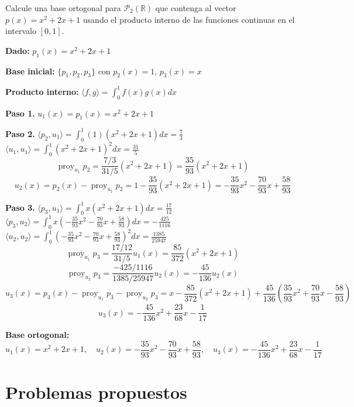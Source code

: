 \begin{prob} 
Calcule una base ortogonal para $\mathcal{P}_{2}(\mathbb{R})$ que contenga al vector $p(x)=x^2+2x+1$ usando el producto interno de las funciones continuas en el intervalo $[0,1].$
\begin{myproof}
\textbf{Dado:} $p_1(x) = x^2 + 2x + 1$

\textbf{Base inicial:} $\{p_1, p_2, p_3\}$ con $p_2(x) = 1$, $p_3(x) = x$

\textbf{Producto interno:} $\langle f, g \rangle = \int_0^1 f(x)g(x)  dx$

\textbf{Paso 1.}  
$u_1(x) = p_1(x) = x^2 + 2x + 1$

\textbf{Paso 2.}  
$\langle p_2, u_1 \rangle = \int_0^1 (1)(x^2 + 2x + 1)  dx = \frac{7}{3}$ \\
$\langle u_1, u_1 \rangle = \int_0^1 (x^2 + 2x + 1)^2  dx = \frac{31}{5}$ \\
\[
\operatorname{proy}_{u_1} p_2 = \frac{7/3}{31/5} (x^2 + 2x + 1) = \frac{35}{93} (x^2 + 2x + 1)
\]
\[
u_2(x) = p_2(x) - \operatorname{proy}_{u_1} p_2 = 1 - \frac{35}{93}(x^2 + 2x + 1) = -\frac{35}{93}x^2 - \frac{70}{93}x + \frac{58}{93}
\]

\textbf{Paso 3.}  
$\langle p_3, u_1 \rangle = \int_0^1 x(x^2 + 2x + 1)  dx = \frac{17}{12}$ \\
$\langle p_3, u_2 \rangle = \int_0^1 x \left( -\frac{35}{93}x^2 - \frac{70}{93}x + \frac{58}{93} \right)  dx = -\frac{425}{1116}$ \\
$\langle u_2, u_2 \rangle = \int_0^1 \left( -\frac{35}{93}x^2 - \frac{70}{93}x + \frac{58}{93} \right)^2  dx = \frac{1385}{25947}$ \\
\[
\operatorname{proy}_{u_1} p_3 = \frac{17/12}{31/5} u_1(x) = \frac{85}{372} (x^2 + 2x + 1)
\]
\[
\operatorname{proy}_{u_2} p_3 = \frac{-425/1116}{1385/25947} u_2(x) = -\frac{45}{136} u_2(x)
\]
\[
u_3(x) = p_3(x) - \operatorname{proy}_{u_1} p_3 - \operatorname{proy}_{u_2} p_3 = x - \frac{85}{372}(x^2 + 2x + 1) + \frac{45}{136} \left( \frac{35}{93}x^2 + \frac{70}{93}x - \frac{58}{93} \right)
\]
\[
u_3(x) = -\frac{45}{136}x^2 + \frac{23}{68}x - \frac{1}{17}
\]

\textbf{Base ortogonal:}
\[
\boxed{u_1(x) = x^2 + 2x + 1, \quad u_2(x) = -\frac{35}{93}x^2 - \frac{70}{93}x + \frac{58}{93}, \quad u_3(x) = -\frac{45}{136}x^2 + \frac{23}{68}x - \frac{1}{17}}
\]
\end{myproof}
\end{prob}


\section{Problemas propuestos}

